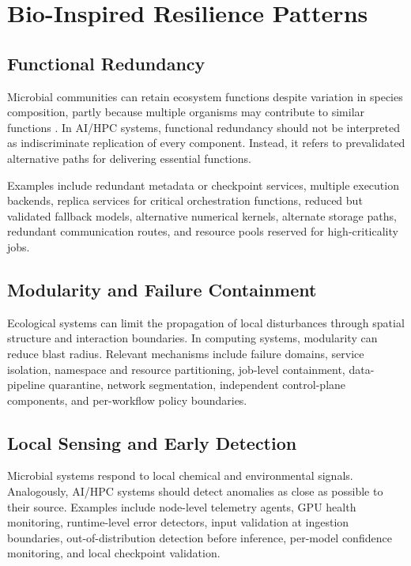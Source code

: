 \documentclass[conference]{IEEEtran}
\begin{document}
\section{Bio-Inspired Resilience Patterns}

\subsection{Functional Redundancy}

Microbial communities can retain ecosystem functions despite variation in species composition, partly because multiple organisms may contribute to similar functions \cite{allison2008}. In AI/HPC systems, functional redundancy should not be interpreted as indiscriminate replication of every component. Instead, it refers to prevalidated alternative paths for delivering essential functions.

Examples include redundant metadata or checkpoint services, multiple execution backends, replica services for critical orchestration functions, reduced but validated fallback models, alternative numerical kernels, alternate storage paths, redundant communication routes, and resource pools reserved for high-criticality jobs.

\subsection{Modularity and Failure Containment}

Ecological systems can limit the propagation of local disturbances through spatial structure and interaction boundaries. In computing systems, modularity can reduce blast radius. Relevant mechanisms include failure domains, service isolation, namespace and resource partitioning, job-level containment, data-pipeline quarantine, network segmentation, independent control-plane components, and per-workflow policy boundaries.

\subsection{Local Sensing and Early Detection}

Microbial systems respond to local chemical and environmental signals. Analogously, AI/HPC systems should detect anomalies as close as possible to their source. Examples include node-level telemetry agents, GPU health monitoring, runtime-level error detectors, input validation at ingestion boundaries, out-of-distribution detection before inference, per-model confidence monitoring, and local checkpoint validation.
\end{document}
